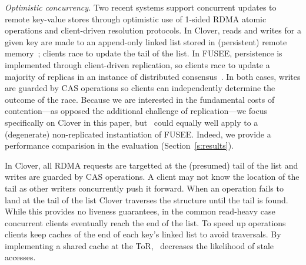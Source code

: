 \emph{Optimistic concurrency.}  Two recent systems support concurrent
updates to remote key-value stores through optimistic use of
1-sided RDMA atomic operations and client-driven resolution protocols. 
In Clover, reads and writes for a given key are made to an append-only
linked list stored in (persistent) remote memory~\cite{clover};
clients race to update the tail of the list.  In FUSEE, persistence is
implemented through client-driven replication, so clients race to
update a majority of replicas in an instance of distributed
consensus~\cite{fusee}.  In both cases, writes are guarded by CAS
operations so clients can independently determine the outcome of the
race.  Because we are interested in the fundamental costs of
  contention---as opposed the additional challenge of replication---we focus specifically on Clover in this paper, but \sword\ could equally well apply to a (degenerate) non-replicated instantiation of FUSEE.  Indeed, we provide a performance comparision in the evaluation (Section~\ref{s:results}).

In Clover, all RDMA requests
are targetted at the (presumed) tail of the list and writes are
guarded by CAS operations. A client may not know the location of the
tail as other writers concurrently push it forward. When an operation
fails to land at the tail of the list Clover traverses the
structure until the tail is found. While this provides no liveness
guarantees, in the common read-heavy case concurrent clients
eventually reach the end of the list. To speed up operations clients
keep caches of the end of each key's linked list to
avoid traversals.
By implementing a shared cache at the ToR, \sword\ 
decreases the likelihood of stale accesses.

